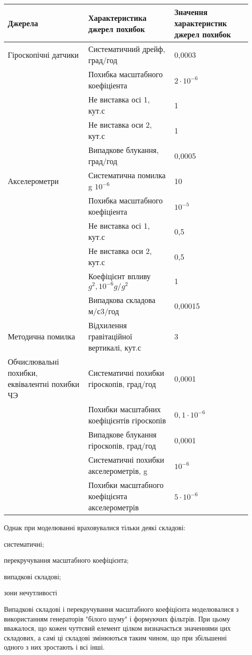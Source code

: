 \begin{tabular}{|p{0.9in}|p{2.2in}|p{1.4in}|} \hline 
Джерела & Характеристика джерел похибок & Значення характеристик джерел похибок \\ \hline 
Гіроскопічні датчики & Систематичний дрейф, град/год & 0,0003 \\ \hline 
 & Похибка масштабного коефіціента & $2\cdot 10^{-6} $ \\ \hline 
 & Не виставка осі 1, кут.с & 1 \\ \hline 
 & Не виставка оси 2, кут.с & 1 \\ \hline 
 & Випадкове блукання, град/год & 0,0005 \\ \hline 
Акселерометри & Систематична помилка g $10^{-6} $ & 10 \\ \hline 
 & Похибка масштабного коефіціента & $10^{-5} $ \\ \hline 
 & Не виставка осі 1, кут.с & 0,5 \\ \hline 
 & Не виставка оси 2, кут.с & 0,5 \\ \hline 
 & Коефіцієнт впливу $g^{2} ,10^{-6} g/g^{2} $ & 1 \\ \hline 
 & Випадкова складова м/с3/год & 0,00015 \\ \hline 
Методична помилка & Відхилення гравітаційної вертикалі, кут.с & 3 \\ \hline 
Обчислювальні похибки, еквівалентні похибки ЧЭ & Систематичні похибки гіроскопів, град/год & 0,0001 \\ \hline 
 & Похибки масштабних коефіцієнтів гіроскопів & $0,1\cdot 10^{-6} $ \\ \hline 
 & Випадкове блукання гіроскопів, град/год & 0,0001 \\ \hline 
 & Систематичні похибки акселерометрів, g & $10^{-6} $ \\ \hline 
 & Похибки масштабного коефіцієнта акселерометрів & $5\cdot 10^{-6} $ \\ \hline 
\end{tabular}



Однак при моделюванні враховувалися тільки деякі складові:

систематичні;

перекручування масштабного коефіцієнта;

випадкові складові;

зони нечутливості

 Випадкові складові і перекручування масштабного коефіцієнта моделювалися з використанням генераторів "білого шуму" 
і формуючих фільтрів. При цьому вважалося, що кожен чуттєвий елемент цілком визначається значеннями цих складових, 
а самі ці складові змінюються таким чином, що при збільшенні одного з них зростають і всі інші.

